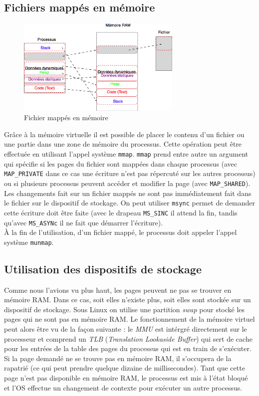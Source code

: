 \subsection{Fichiers mappés en mémoire}
\begin{figure}[!h]
  \centering \includegraphics[width=0.7\textwidth]{mmap}
  \caption{\label{fig:mmap}Fichier mappés en mémoire}
\end{figure}
Grâce à la mémoire virtuelle il est possible de placer le contenu d'un fichier ou une partie dans une zone de mémoire du processus. Cette opération peut être effectuée en utilisant l'appel système \texttt{mmap}. \texttt{mmap} prend entre autre un argument qui spécifie si les pages du fichier sont mappées dans chaque processus (avec \texttt{MAP\_PRIVATE} dans ce cas une écriture n'est pas répercuté sur les autres processus) ou si plusieurs processus peuvent accéder et modifier la page (avec \texttt{MAP\_SHARED}). Les changements fait sur un fichier mappés ne sont pas immédiatement fait dans le fichier sur le dispositif de stockage. On peut utiliser \texttt{msync} permet de demander cette écriture doit être faite (avec le drapeau \texttt{MS\_SINC} il attend la fin, tandis qu'avec \texttt{MS\_ASYNc} il ne fait que démarrer l'écriture). \\
À la fin de l'utilisation, d'un fichier mappé, le processus doit appeler l'appel système \texttt{munmap}.
\subsection{Utilisation des dispositifs de stockage}
Comme nous l'avions vu plus haut, les pages peuvent ne pas se trouver en mémoire RAM. Dans ce cas, soit elles n'existe plus, soit elles sont stockée sur un dispositif de stockage. Sous Linux on utilise une partition \textit{swap} pour stocké les pages qui ne sont pas en mémoire RAM. Le fonctionnement de la mémoire virtuel peut alors être vu de la façon suivante : le \textit{MMU} est intérgré directement sur le processeur et comprend un \textit{TLB} (\textit{Translation Lookaside Buffer}) qui sert de cache pour les entrées de la table des pages du processus qui est en train de s'exécuter. Si la page demandé ne se trouve pas en mémoire RAM, il s'occupera de la rapatrié (ce qui peut prendre quelque dizaine de millisecondes). Tant que cette page n'est pas disponible en mémoire RAM, le processus est mis à l'état bloqué et l'OS effectue un changement de contexte pour exécuter un autre processus.
